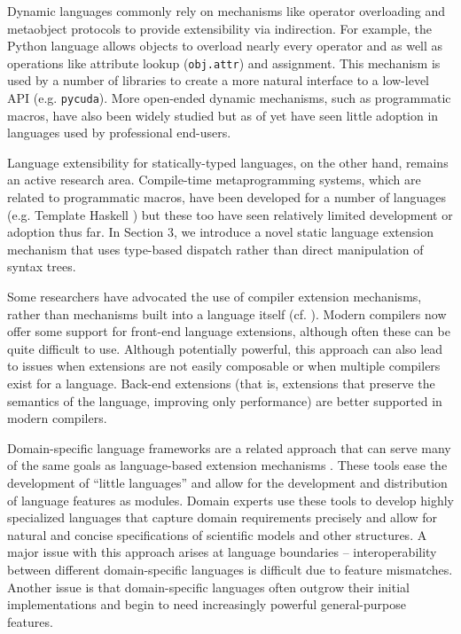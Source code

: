 \documentclass{llncs}
\begin{document}
Dynamic languages commonly rely on mechanisms like operator overloading and metaobject protocols \cite{Kiczales91} to provide extensibility via indirection. For example, the Python language allows objects to overload nearly every operator and as well as operations like attribute lookup (\verb|obj.attr|) and assignment. This mechanism is used by a number of libraries to create a more natural interface to a low-level API (e.g. \verb|pycuda|). More open-ended dynamic mechanisms, such as programmatic macros, have also been widely studied but as of yet have seen little adoption in languages used by professional end-users. 

Language extensibility for statically-typed languages, on the other hand, remains an active research area. Compile-time metaprogramming systems, which are related to programmatic macros, have been developed for a number of languages (e.g. Template Haskell \cite{sheard2002template}) but these too have seen relatively limited development or adoption thus far. In Section 3, we introduce a novel static language extension mechanism that uses type-based dispatch rather than direct manipulation of syntax trees.

Some researchers have advocated the use of compiler extension mechanisms, rather than mechanisms built into a language itself (cf. \cite{clements2008comparison}). Modern compilers now offer some support for front-end language extensions, although often these  can be quite difficult to use.  Although potentially powerful, this approach can also lead to issues when extensions are not easily composable or when multiple compilers exist for a language. Back-end extensions (that is, extensions that preserve the semantics of the language, improving only performance) are better supported in modern compilers.

Domain-specific language frameworks are a related approach that can serve many of the same goals as language-based  extension mechanisms \cite{fowler2010domain}. These tools ease the development of ``little languages'' and allow for the development and distribution of language features as modules. Domain experts use these tools to develop highly specialized languages that capture domain requirements precisely and allow for natural and concise specifications of scientific models and other structures. A major issue with this approach arises at language boundaries -- interoperability between different domain-specific languages is difficult due to feature mismatches. Another issue is that domain-specific languages often outgrow their initial implementations and begin to need increasingly powerful general-purpose features.
\end{document}
